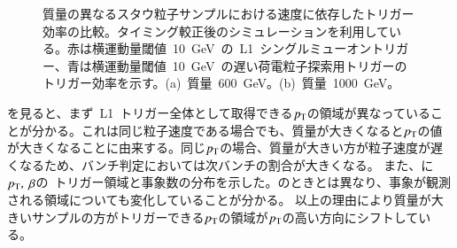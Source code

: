 \begin{figure}[H]
\begin{minipage}{0.49\hsize}
    \subcaption{}
    \end{minipage}
    \caption[質量の異なるスタウ粒子サンプルにおける速度に依存したトリガー効率の比較]{質量の異なるスタウ粒子サンプルにおける速度に依存したトリガー効率の比較。タイミング較正後のシミュレーションを利用している。赤は横運動量閾値~10~GeV~の~L1~シングルミューオントリガー、青は横運動量閾値~10~GeV~の遅い荷電粒子探索用トリガーのトリガー効率を示す。(a)~質量~600~GeV。(b)~質量~1000~GeV。}\label{fig:tribeta6}
\end{figure}
を見ると、まず~L1~トリガー全体として取得できる$p_{\rm{T}}$の領域が異なっていることが分かる。これは同じ粒子速度である場合でも、質量が大きくなると$p_{\rm{T}}$の値が大きくなることに由来する。同じ$p_{\rm{T}}$の場合、質量が大きい方が粒子速度が遅くなるため、バンチ判定においては次バンチの割合が大きくなる。
また、に$p_{\rm{T}},~\beta$の~トリガー領域と事象数の分布を示した。のときとは異なり、事象が観測される領域についても変化していることが分かる。
以上の理由により質量が大きいサンプルの方がトリガーできる$p_{\rm{T}}$の領域が$p_{\rm{T}}$の高い方向にシフトしている。

